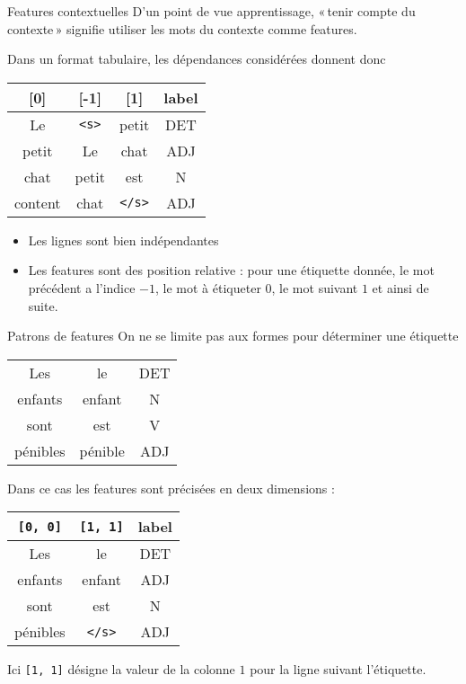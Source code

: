 \documentclass[hyperref={unicode}, xcolor={svgnames}, french]{beamer}
\begin{document}
\begin{frame}[fragile=singleslide]{Features contextuelles}
	D'un point de vue apprentissage, « tenir compte du contexte » signifie utiliser les mots du contexte comme \alert{features}.

	Dans un format tabulaire, les dépendances considérées donnent donc
	\begin{table}
		\begin{tabu} to .9\textwidth {cccc}
			[0]	& [-1]	& [1]	& label\\
			\midrule
			Le	& \texttt{<s>}	& petit	& DET\\
			petit	& Le	& chat	& ADJ\\
			chat	& petit	& est	& N\\
			content	& chat	& \texttt{</s>}	& ADJ
		\end{tabu}
	\end{table}

	\begin{itemize}
		\item Les lignes sont bien indépendantes
		\item Les features sont des position relative : pour une étiquette donnée, le mot précédent a l'indice $-1$, le mot à étiqueter $0$, le mot suivant $1$ et ainsi de suite.
	\end{itemize}
\end{frame}

\begin{frame}[fragile=singleslide]{Patrons de features}
	On ne se limite pas aux formes pour déterminer une étiquette
	\vspace{-\smallskipamount}
	\begin{table}
		\begin{tabu} to .9\textwidth {ccc}
			Les	& le	& DET\\
			enfants	& enfant	& N\\
			sont	& est	& V\\
			pénibles & pénible	& ADJ
		\end{tabu}
	\end{table}
	\vspace{-\smallskipamount}
	Dans ce cas les features sont précisées en deux dimensions :
	\begin{table}
		\begin{tabu} to .9\textwidth {ccc}
			\texttt{[0, 0]}	& \texttt{[1, 1]}	& label\\
			\midrule
			Les	& le 	& DET\\
			enfants	& enfant 	& ADJ\\
			sont	& est 	& N\\
			pénibles	& \texttt{</s>}	& ADJ
		\end{tabu}
	\end{table}
	\vspace{-1.5\smallskipamount}
	Ici \texttt{[1, 1]} désigne la valeur de la colonne $1$ pour la ligne suivant l'étiquette.
\end{frame}
\end{document}
